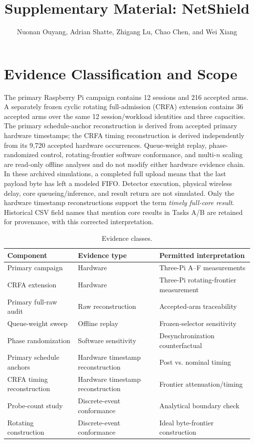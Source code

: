 \documentclass[10pt,onecolumn]{IEEEtran}
\newcommand{\CRFA}{\textsc{CRFA}}
\begin{document}
\title{Supplementary Material: NetShield}
\author{Nuonan Ouyang, Adrian Shatte, Zhigang Lu, Chao Chen, and Wei Xiang}
\maketitle

\section{Evidence Classification and Scope}
The primary Raspberry Pi campaign contains 12 sessions and 216 accepted
arms. A separately frozen cyclic rotating full-admission (\CRFA{}) extension
contains 36 accepted arms over the same 12 session/workload identities and
three capacities. The primary schedule-anchor reconstruction is derived from
accepted primary hardware timestamps; the CRFA timing reconstruction is
derived independently from its 9,720 accepted hardware occurrences.
Queue-weight replay, phase-randomized control, rotating-frontier software
conformance, and multi-$n$ scaling are read-only offline analyses and do not
modify either hardware evidence chain.
In these archived simulations, a completed full upload means that the last
payload byte has left a modeled FIFO. Detector execution, physical wireless
delay, core queueing/inference, and result return are not simulated. Only the
hardware timestamp reconstructions support the term \emph{timely full-core
result}. Historical CSV field names that mention core results in Tasks A/B
are retained for provenance, with this corrected interpretation.

\begin{table}[h]\centering\caption{Evidence classes.}\begin{tabular}{lll}\toprule
Component & Evidence type & Permitted interpretation\\\midrule
Primary campaign & Hardware & Three-Pi A--F measurements\\
CRFA extension & Hardware & Three-Pi rotating-frontier measurement\\
Primary full-raw audit & Raw reconstruction & Accepted-arm traceability\\
Queue-weight sweep & Offline replay & Frozen-selector sensitivity\\
Phase randomization & Software sensitivity & Desynchronization counterfactual\\
Primary schedule anchors & Hardware timestamp reconstruction & Post vs. nominal timing\\
CRFA timing reconstruction & Hardware timestamp reconstruction & Frontier attenuation/timing\\
Probe-count study & Discrete-event conformance & Analytical boundary check\\
Rotating construction & Discrete-event conformance & Ideal byte-frontier construction\\\bottomrule
\end{tabular}\end{table}
\end{document}
